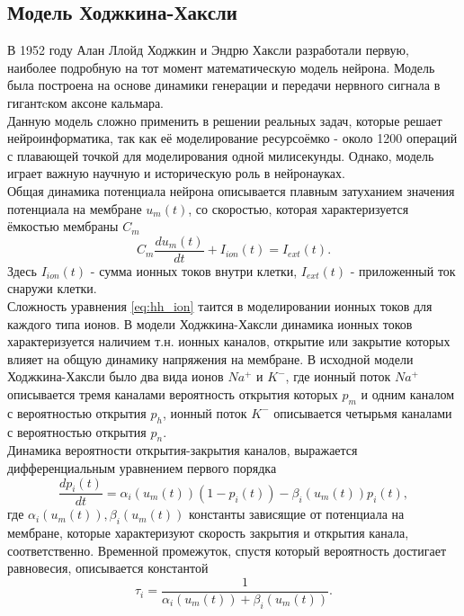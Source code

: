 \documentclass[a4paper,10pt]{article}
\begin{document}
\subsection{Модель Ходжкина-Хаксли}
	В 1952 году Алан Ллойд Ходжкин и Эндрю Хаксли разработали первую, наиболее подробную на тот момент математическую модель нейрона. Модель была построена на основе динамики генерации и передачи нервного сигнала в гигантcком аксоне кальмара.\\
	\indent Данную модель сложно применить в решении реальных задач, которые решает нейроинформатика, так как её моделирование ресурсоёмко - около 1200 операций с плавающей точкой для моделирования одной милисекунды\cite{BohteReview}. Однако, модель играет важную научную и историческую роль в нейронауках.\\
	\indent Общая динамика потенциала нейрона описывается плавным затуханием значения потенциала на мембране $u_{m}(t)$, со скоростью, которая характеризуется ёмкостью мембраны $C_{m}$
	\begin{equation}\label{eq:hh}
	C_{m}\frac{du_{m}(t)}{dt}+I_{ion}(t)=I_{ext}(t).
	\end{equation}	 
	\indent Здесь $I_{ion}(t)$ - сумма ионных токов внутри клетки, $I_{ext}(t)$ - приложенный ток снаружи клетки.\\
	\indent Сложность уравнения \eqref{eq:hh_ion}	 таится в моделировании ионных токов для каждого типа ионов. В модели Ходжкина-Хаксли динамика ионных токов характеризуется наличием т.н. ионных каналов, открытие или закрытие которых влияет на общую динамику напряжения на мембране. В исходной модели Ходжкина-Хаксли было два вида ионов $Na^{+}$ и $K^{-}$, где ионный поток $Na^{+}$ описывается тремя каналами вероятность открытия которых $p_{m}$ и одним каналом с вероятностью открытия $p_{h}$, ионный поток $K^{-}$ описывается четырьмя каналами с вероятностью открытия $p_{n}$\cite{Genesis}.\\ 
	\indent Динамика вероятности открытия-закрытия каналов, выражается дифференциальным уравнением первого порядка
	\begin{equation}\label{eq:hh_pch}
	\frac{dp_{i}(t)}{dt} = \alpha_{i}(u_{m}(t))(1-p_{i}(t)) - \beta_{i}(u_{m}(t))p_{i}(t),
	\end{equation}	 
	где $\alpha_{i}(u_{m}(t)), \beta_{i}(u_{m}(t))$ константы зависящие от потенциала на мембране, которые характеризуют скорость закрытия и открытия канала, соответственно. Временной промежуток, спустя который вероятность достигает равновесия, описывается константой
	\begin{equation}\label{eq:hh_t}
	\tau_{i}=\frac{1}{\alpha_{i}(u_{m}(t))+\beta_{i}(u_{m}(t))}.	
	\end{equation}
\end{document}

